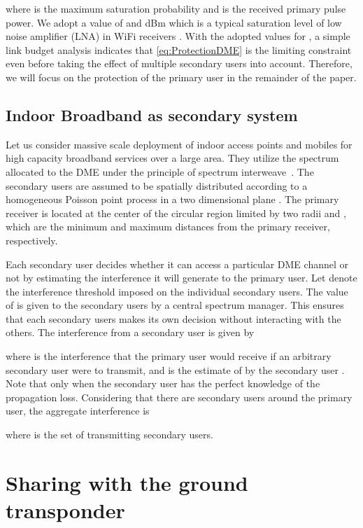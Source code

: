 \documentclass[12pt,submission,journal,onecolumn]{IEEEtran}
\begin{document}
where  is the maximum saturation probability and  is the received primary pulse power. We adopt a value of  and dBm which is a typical saturation level of low noise amplifier (LNA) in WiFi receivers \cite{wp:ti2003}. With the adopted values for , a simple link budget analysis indicates that \eqref{eq:ProtectionDME} is the limiting constraint even before taking the effect of multiple secondary users into account. Therefore, we will focus on the protection of the primary user in the remainder of the paper.

\subsection{Indoor Broadband as secondary system}

Let us consider massive scale deployment of indoor access points and mobiles for high capacity broadband services over a large area. They utilize the spectrum allocated to the DME under the principle of spectrum interweave~\cite{4840529}. The secondary users are assumed to be spatially distributed according to a homogeneous Poisson point process in a two dimensional plane . The primary receiver is located at the center of the circular region limited by two radii  and , which are the minimum and maximum distances from the primary receiver, respectively.

Each secondary user decides whether it can access a particular DME channel or not by estimating the interference it will generate to the primary user. Let  denote the interference threshold imposed on the individual secondary users. The value of  is given to the secondary users by a central spectrum manager. This ensures that each secondary users makes its own decision without interacting with the others. The interference from a secondary user  is given by


where  is the interference that the primary user would receive if an arbitrary secondary user were to transmit, and  is the estimate of  by the secondary user . Note that  only when the secondary user has the perfect knowledge of the propagation loss. Considering that there are  secondary users around the primary user, the aggregate interference is

where  is the set of transmitting secondary users.

\section{Sharing with the ground transponder}
\label{sec:interferenceGround}
\end{document}
